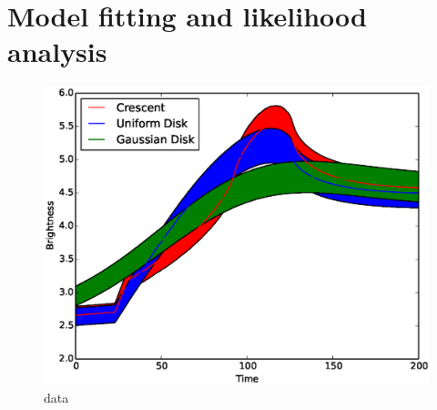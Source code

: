 \section{Model fitting and likelihood analysis}

\begin{figure}
\centering
  \includegraphics[width=0.95\hsize]{plots/data_with_error.eps}
\caption{\label{fig:datafitting} data}
\end{figure}


